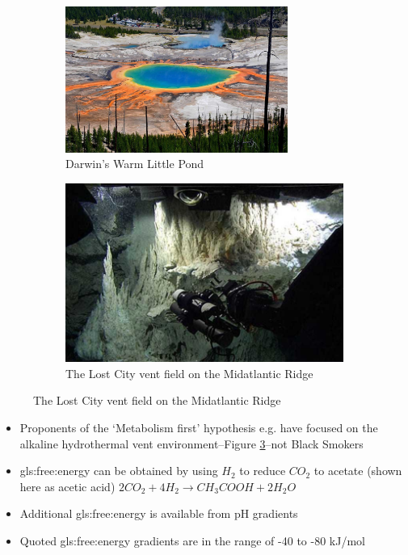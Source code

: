 \documentclass[]{article}
\begin{document}
\begin{figure}[H]
	\caption{Environments are also important}
	\begin{subfigure}[t]{0.45\textwidth}
		\centering
		\caption{Darwin's Warm Little Pond}\label{fig:DarwinsWarmLittlePond}
		\includegraphics[width=0.8\textwidth]{DarwinsWarmLittlePond}
	\end{subfigure}
	\begin{subfigure}[t]{0.45\textwidth}
		\centering
	\caption{The Lost City vent field on the Midatlantic
	Ridge}\label{fig:lost_city_vent_field}
\includegraphics[width=\textwidth]{lost_city_vent_field}
	\end{subfigure}
\end{figure}

\begin{itemize}
	\item Proponents of the ‘Metabolism first’ hypothesis e.g. \cite{russell2006onset} have focused on the alkaline hydrothermal vent environment--Figure \ref{fig:lost_city_vent_field}--not Black Smokers
	\item \Gls{gls:free:energy} can be obtained by 	using $H_2$ to reduce $CO_2$ to	acetate (shown here as acetic 	acid)
	$2 CO_2 + 4 H_2 \rightarrow CH_3 COOH + 2 H_2O$
	\item Additional \Gls{gls:free:energy} is 	available from pH gradients
	\item Quoted \Gls{gls:free:energy} gradients are in the range of -40 to -80 	kJ/mol
\end{itemize}
\end{document}
